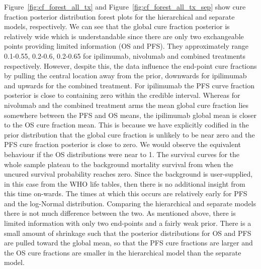\documentclass[AMA,STIX1COL]{WileyNJD-v2}
\begin{document}
Figure~\ref{fig:cf_forest_all_tx} and Figure~\ref{fig:cf_forest_all_tx_sep} show cure fraction posterior distribution forest plots for the hierarchical and separate models, respectively. 
We can see that the global cure fraction posterior is relatively wide which is understandable since there are only two exchangeable points providing limited information (OS and PFS).
They approximately range 0.1-0.55, 0.2-0.6, 0.2-0.65 for ipilimumab, nivolumab and combined treatments respectively. 
However, despite this, the data influence the end-point cure fractions by pulling the central location away from the prior, downwards for ipilimumab and upwards for the combined treatment.
For ipilimumab the PFS curve fraction posterior is close to containing zero within the credible interval.
Whereas for nivolumab and the combined treatment arms the mean global cure fraction lies somewhere between the PFS and OS means, the ipilimumab global mean is closer to the OS cure fraction mean. This is because we have explicitly codified in the prior distribution that the global cure fraction is unlikely to be near zero and the PFS cure fraction posterior is close to zero.
We would observe the equivalent behaviour if the OS distributions were near to 1.
The survival curves for the whole sample plateau to the background mortality survival from when the uncured survival probability reaches zero.
Since the background is user-supplied, in this case from the WHO life tables, then there is no additional insight from this time on-wards.
The times at which this occurs are relatively early for PFS and the log-Normal distribution.
Comparing the hierarchical and separate models there is not much difference between the two.
As mentioned above, there is limited information with only two end-points and a fairly weak prior.
There is a small amount of shrinkage such that the posterior distributions for OS and PFS are pulled toward the global mean, so that the PFS cure fractions are larger and the OS cure fractions are smaller in the hierarchical model than the separate model.
\end{document}
